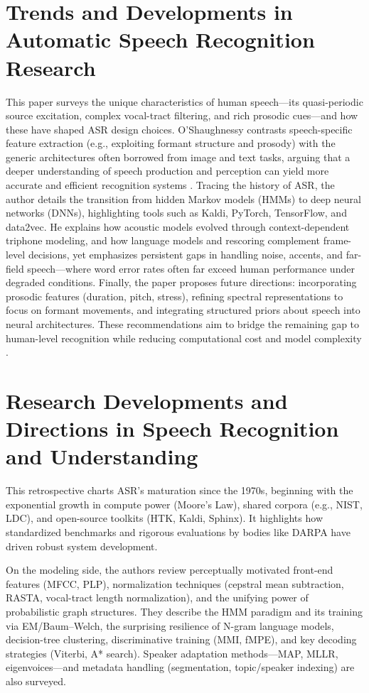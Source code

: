 \section*{Trends and Developments in Automatic Speech Recognition Research}

This paper surveys the unique characteristics of human speech—its quasi-periodic source excitation, complex vocal-tract filtering, and rich prosodic cues—and how these have shaped ASR design choices. O’Shaughnessy contrasts speech-specific feature extraction (e.g., exploiting formant structure and prosody) with the generic architectures often borrowed from image and text tasks, arguing that a deeper understanding of speech production and perception can yield more accurate and efficient recognition systems .
\bigskip
Tracing the history of ASR, the author details the transition from hidden Markov models (HMMs) to deep neural networks (DNNs), highlighting tools such as Kaldi, PyTorch, TensorFlow, and data2vec. He explains how acoustic models evolved through context-dependent triphone modeling, and how language models and rescoring complement frame-level decisions, yet emphasizes persistent gaps in handling noise, accents, and far-field speech—where word error rates often far exceed human performance under degraded conditions.
\bigskip
Finally, the paper proposes future directions: incorporating prosodic features (duration, pitch, stress), refining spectral representations to focus on formant movements, and integrating structured priors about speech into neural architectures. These recommendations aim to bridge the remaining gap to human-level recognition while reducing computational cost and model complexity .

\bigskip

\section*{Research Developments and Directions in Speech Recognition and Understanding}

This retrospective charts ASR’s maturation since the 1970s, beginning with the exponential growth in compute power (Moore’s Law), shared corpora (e.g., NIST, LDC), and open-source toolkits (HTK, Kaldi, Sphinx). It highlights how standardized benchmarks and rigorous evaluations by bodies like DARPA have driven robust system development.

\bigskip

On the modeling side, the authors review perceptually motivated front-end features (MFCC, PLP), normalization techniques (cepstral mean subtraction, RASTA, vocal-tract length normalization), and the unifying power of probabilistic graph structures. They describe the HMM paradigm and its training via EM/Baum–Welch, the surprising resilience of N-gram language models, decision-tree clustering, discriminative training (MMI, fMPE), and key decoding strategies (Viterbi, A* search). Speaker adaptation methods—MAP, MLLR, eigenvoices—and metadata handling (segmentation, topic/speaker indexing) are also surveyed.

